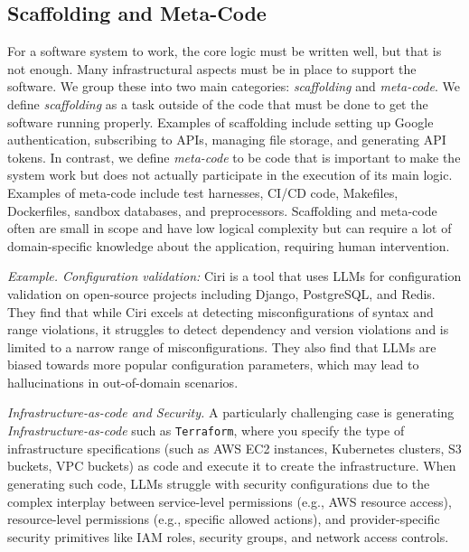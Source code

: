 \subsection{Scaffolding and Meta-Code} \label{subsec:scaffolding-metacode}

For a software system to work, the core logic must be written well, but that is not enough. Many infrastructural aspects must be in place to support the software. We group these into two main categories: \textit{scaffolding} and \textit{meta-code}. We define \textit{scaffolding} as a task outside of the code that must be done to get the software running properly. Examples of scaffolding include setting up Google authentication, subscribing to APIs, managing file storage, and generating API tokens. In contrast, we define \textit{meta-code} to be code that is important to make the system work but does not actually participate in the execution of its main logic. Examples of meta-code include test harnesses, CI/CD code, Makefiles, Dockerfiles, sandbox databases, and preprocessors. Scaffolding and meta-code often are small in scope and have low logical complexity but can require a lot of domain-specific knowledge about the application, requiring human intervention.

\begin{tcolorbox}[colback=lightblue, boxrule=0pt, arc=5pt, outer arc=5pt]
\textit{Example. Configuration validation:} Ciri \citep{lian2024large} is a tool that uses LLMs for configuration validation on open-source projects including Django, PostgreSQL, and Redis. They find that while Ciri excels at detecting misconfigurations of syntax and range violations, it struggles to detect dependency and version violations and is limited to a narrow range of misconfigurations. They also find that LLMs are biased towards more popular configuration parameters, which may lead to hallucinations in out-of-domain scenarios. 
\end{tcolorbox}

\textit{Infrastructure-as-code and Security.} A particularly challenging case is generating \textit{Infrastructure-as-code} such as \texttt{Terraform}, where you specify the type of infrastructure specifications (such as AWS EC2 instances, Kubernetes clusters, S3 buckets, VPC buckets) as code and execute it to create the infrastructure. When generating such code, LLMs struggle with security configurations due to the complex interplay between service-level permissions (e.g., AWS resource access), resource-level permissions (e.g., specific allowed actions), and provider-specific security primitives like IAM roles, security groups, and network access controls.

